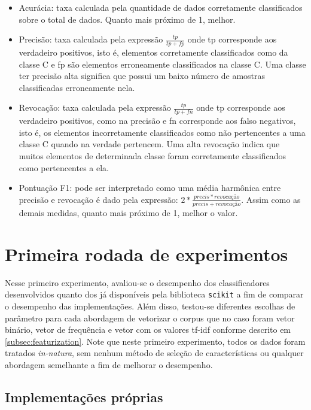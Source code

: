 \begin{itemize}
	\item Acurácia: taxa calculada pela quantidade de dados corretamente classificados
	sobre o total de dados. Quanto mais próximo de 1, melhor.
	\item Precisão: taxa calculada pela expressão $\frac{tp}{tp + fp}$ onde tp corresponde
	aos verdadeiro positivos, isto é, elementos corretamente classificados como da classe C
	e fp são elementos erroneamente classificados na classe C. Uma classe ter precisão alta
	significa que possui um baixo número de amostras classificadas erroneamente nela.
	\item Revocação: taxa calculada pela expressão $\frac{tp}{tp + fn}$ onde tp corresponde
	aos verdadeiro positivos, como na precisão e fn corresponde
	aos falso negativos, isto é, os elementos incorretamente classificados como não pertencentes
	a uma classe C quando na verdade pertencem. Uma alta revocação indica que muitos elementos
	de determinada classe foram corretamente classificados como pertencentes a ela.
	\item Pontuação F1: pode ser interpretado como uma média harmônica entre precisão e revocação é dado
	pela expressão: $2*\frac{precis*revocação}{precis + revocação}$. Assim como as demais medidas, quanto
	mais próximo de 1, melhor o valor.
\end{itemize}

\section{Primeira rodada de experimentos}

Nesse primeiro experimento, avaliou-se o desempenho dos classificadores desenvolvidos quanto dos
já disponíveis pela biblioteca \texttt{scikit} a fim de comparar o desempenho das implementações.
Além disso, testou-se diferentes escolhas de parâmetro para cada abordagem de vetorizar o corpus
que no caso foram vetor binário, vetor de frequência e vetor com os valores tf-idf conforme descrito
em \ref{subsec:featurization}. 
Note que neste primeiro experimento, todos os dados foram tratados \textit{in-natura}, sem nenhum método de seleção de características ou qualquer abordagem semelhante a fim de melhorar o desempenho.

\subsection{Implementações próprias}

